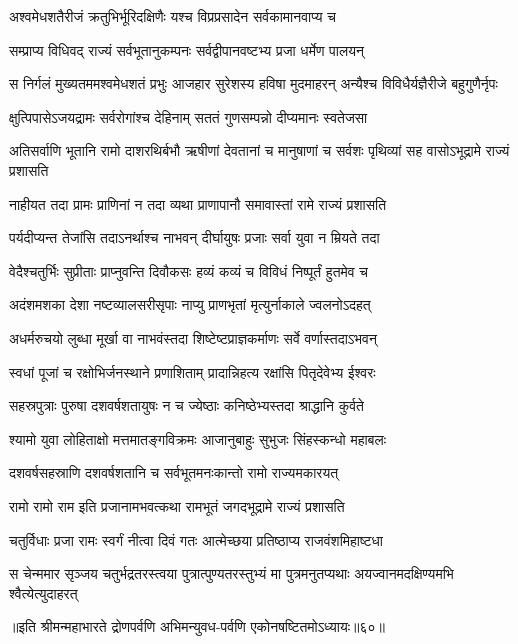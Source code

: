 \twolineshloka
{अश्वमेधशतैरीजं क्रतुभिर्भूरिदक्षिणैः}
{यश्च विप्रप्रसादेन सर्वकामानवाप्य च}


\twolineshloka
{सम्प्राप्य विधिवद् राज्यं सर्वभूतानुकम्पनः}
{सर्वद्वीपानवष्टभ्य प्रजा धर्मेण पालयन्}


\threelineshloka
{स निर्गलं मुख्यतममश्वमेधशतं प्रभुः}
{आजहार सुरेशस्य हविषा मुदमाहरन्}
{अन्यैश्च विविधैर्यज्ञैरीजे बहुगुणैर्नृपः}


\twolineshloka
{क्षुत्पिपासेऽजयद्रामः सर्वरोगांश्च देहिनाम्}
{सततं गुणसम्पन्नो दीप्यमानः स्वतेजसा}


\threelineshloka
{अतिसर्वाणि भूतानि रामो दाशरथिर्बभौ}
{ऋषीणां देवतानां च मानुषाणां च सर्वशः}
{पृथिव्यां सह वासोऽभूद्रामे राज्यं प्रशासति}


\twolineshloka
{नाहीयत तदा प्रामः प्राणिनां न तदा व्यथा}
{प्राणापानौ समावास्तां रामे राज्यं प्रशासति}


\twolineshloka
{पर्यदीप्यन्त तेजांसि तदाऽनर्थाश्च नाभवन्}
{दीर्घायुषः प्रजाः सर्वा युवा न म्रियते तदा}


\twolineshloka
{वेदैश्चतुर्भिः सुप्रीताः प्राप्नुवन्ति दिवौकसः}
{हव्यं कव्यं च विविधं निष्पूर्तं हुतमेव च}


\twolineshloka
{अदंशमशका देशा नष्टव्यालसरीसृपाः}
{नाप्यु प्राणभृतां मृत्युर्नाकाले ज्वलनोऽदहत्}


\twolineshloka
{अधर्मरुचयो लुब्धा मूर्खा वा नाभवंस्तदा}
{शिष्टेष्टप्राज्ञकर्माणः सर्वे वर्णास्तदाऽभवन्}


\twolineshloka
{स्वधां पूजां च रक्षोभिर्जनस्थाने प्रणाशिताम्}
{प्रादान्निहत्य रक्षांसि पितृदेवेभ्य ईश्वरः}


\twolineshloka
{सहस्रपुत्राः पुरुषा दशवर्षशतायुषः}
{न च ज्येष्ठाः कनिष्ठेभ्यस्तदा श्राद्धानि कुर्वते}


\twolineshloka
{श्यामो युवा लोहिताक्षो मत्तमातङ्गविक्रमः}
{आजानुबाहुः सुभुजः सिंहस्कन्धो महाबलः}


\twolineshloka
{दशवर्षसहस्राणि दशवर्षशतानि च}
{सर्वभूतमनःकान्तो रामो राज्यमकारयत्}


\twolineshloka
{रामो रामो राम इति प्रजानामभवत्कथा}
{रामभूतं जगदभूद्रामे राज्यं प्रशासति}


\twolineshloka
{चतुर्विधाः प्रजा रामः स्वर्गं नीत्वा दिवं गतः}
{आत्मेच्छया प्रतिष्ठाप्य राजवंशमिहाष्टधा}


\threelineshloka
{स चेन्ममार सृञ्जय चतुर्भद्रतरस्त्वया}
{पुत्रात्पुण्यतरस्तुभ्यं मा पुत्रमनुतप्यथाः}
{अयज्वानमदक्षिण्यमभि श्वैत्येत्युदाहरत्}


॥इति श्रीमन्महाभारते द्रोणपर्वणि अभिमन्युवध-पर्वणि एकोनषष्टितमोऽध्यायः॥६०॥

\closesection